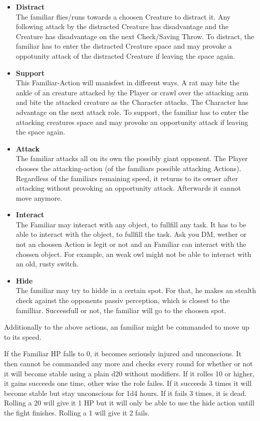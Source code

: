 \documentclass[10pt,twoside,twocolumn,openany]{book}
\begin{document}
\begin{itemize}
\item \textbf{Distract} \\ The familiar flies/runs towards a choosen Creature to distract it. Any following attack by the distracted Creature has disadvantage and the Creature has disadvantage on the next Check/Saving Throw. To distract, the familiar has to enter the distracted Creature space and may provoke a oppotunity attack of the distracted Creature if leaving the space again.
\item \textbf{Support} \\ This Familiar-Action will manisfest in different ways. A rat may bite the ankle of an creature attacked by the Player or crawl over the attacking arm and bite the attacked creature as the Character attacks. The Character has advantage on the next attack role. To support, the familiar has to enter the attacking creatures space and may provoke an opportunity attack if leaving the space again.
\item \textbf{Attack} \\ The familiar attacks all on its own the possibly giant opponent. The Player chooses the attacking-action (of the familiars possible attacking Actions). Regardless of the familiars remaining speed, it returns to its owner after attacking without provoking an opportunity attack. Afterwards it cannot move anymore.
\item \textbf{Interact} \\ The Familiar may interact with any object, to fullfill any task. It has to be able to interact with the object, to fullfill the task. Ask you DM, wether or not an choosen Action is legit or not and an Familiar can interact with the chossen object. For example, an weak owl might not be able to interact with an old, rusty switch.
\item \textbf{Hide} \\ The familiar may try to hidde in a certain spot. For that, he makes an stealth check against the opponents passiv perception, which is closest to the familliar. Successfull or not, the familiar will go to the choosen spot.
\end{itemize}

Additionally to the above actions, an familiar might be commanded to move up to its speed.

If the Familiar HP falls to 0, it becomes seriously injured and unconscious. It then cannot be commanded any more and checks every round for whether or not it will become stable using a plain d20 without modifiers. If it rolles 10 or higher, it gains succeeds one time, other wise the role failes. If it succeeds 3 times it will become stable but stay unconscious for 1d4 hours. If it fails 3 times, it is dead. Rolling a 20 will give it 1 HP but it will only be able to use the hide action untill the fight finishes. Rolling a 1 will give it 2 fails.
\end{document}
